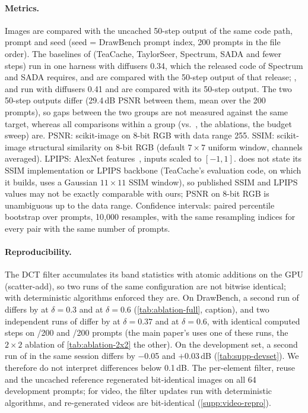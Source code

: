 

\paragraph{Metrics.}
Images are compared with the uncached 50-step output of the same code path, prompt and seed (seed = DrawBench prompt
index, 200 prompts in the file order). The baselines of  (TeaCache, TaylorSeer, Spectrum, SADA
and fewer steps) run in one harness with diffusers 0.34, which the released code of Spectrum and SADA requires, and are
compared with the 50-step output of that release; \ours, \kalsea and \seacache run with diffusers 0.41 and are compared
with its 50-step output. The two 50-step outputs differ (29.4\,dB PSNR between them, mean over the 200 prompts), so gaps
between the two groups are not measured against the same target, whereas all comparisons within a group (\ours vs.\
\seacache, the ablations, the budget sweep) are. PSNR: scikit-image on 8-bit RGB with data range 255. SSIM: scikit-image
structural similarity on 8-bit RGB (default $7{\times}7$ uniform window, channels averaged). LPIPS: AlexNet
features~\cite{zhang2018lpips}, inputs scaled to $[-1,1]$. \seacache does not state its SSIM implementation or LPIPS
backbone (TeaCache's evaluation code, on which it builds, uses a Gaussian $11{\times}11$ SSIM window), so published SSIM
and LPIPS values may not be exactly comparable with ours; PSNR on 8-bit RGB is unambiguous up to the data range. Confidence intervals: paired percentile
bootstrap over prompts, 10{,}000 resamples, with the same resampling indices for every pair with the same number of
prompts.

\paragraph{Reproducibility.}
The DCT filter accumulates its band statistics with atomic additions on the GPU (scatter-add), so two runs of the same
configuration are not bitwise identical; with deterministic algorithms enforced they are. On DrawBench, a second run
of \ours differs by \suppOursRerunA{} at $\delta=0.3$ and \suppOursRerunB{} at $\delta=0.6$
(\cref{tab:ablation-full}, caption), and two independent runs of \kalsea differ by \suppKalRerunA{} at $\delta=0.37$ and
\suppKalRerunB{} at $\delta=0.6$, with identical computed steps on \suppKalRerunSameA/200 and \suppKalRerunSameB/200 prompts (the main paper's  uses one of these runs, the $2{\times}2$ ablation of
\cref{tab:ablation-2x2} the other). On the development set, a second run of \kalsea in the same session differs by $-$0.05 and
$+$0.03\,dB (\cref{tab:supp-devset}). We therefore do not interpret differences below 0.1\,dB. The per-element filter,
reuse and the uncached reference regenerated bit-identical images on all 64 development prompts; for video, the
filter updates run with deterministic algorithms, and re-generated videos are bit-identical
(\cref{supp:video-repro}).

